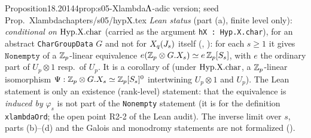 \begin{quoted}{Proposition}{18.20}{144}{prop:s05-Xlambda}{$\Lambda$-adic version; seed Prop.~Xlambda}{chapters/s05/hypX.tex}
\noindent\emph{Lean status} (part (a), finite level only): \stformal{} \emph{conditional on} $\mathrm{Hyp.X.char}$ (carried as the argument \texttt{hX : Hyp.X.char}), for an abstract \texttt{CharGroupData} $G$ and not for $X_q(J_s)$ itself (, ): for each $s\ge1$ it gives $\mathtt{Nonempty}$ of a $\mathbb{Z}_p$-linear equivalence $e(\mathbb{Z}_p\otimes G.X_s)\simeq e\,\mathbb{Z}_p[S_s]$, with $e$ the ordinary part of $U_p\otimes1$ resp.\ of $U_p$. It is a corollary of  (under $\mathrm{Hyp.X.char}$, a $\mathbb{Z}_p$-linear isomorphism $\Psi:\mathbb{Z}_p\otimes G.X_s\simeq\mathbb{Z}_p[S_s]^0$ intertwining $U_p\otimes1$ and $U_p$). The Lean statement is only an existence (rank-level) statement: that the equivalence is \emph{induced by} $\varphi_s$ is not part of the \texttt{Nonempty} statement (it is for the definition \texttt{xlambdaOrd}; the open point R2-2 of the Lean audit). The inverse limit over $s$, parts (b)--(d) and the Galois and monodromy statements are not formalized (\leanplanned{}).
\end{quoted}
